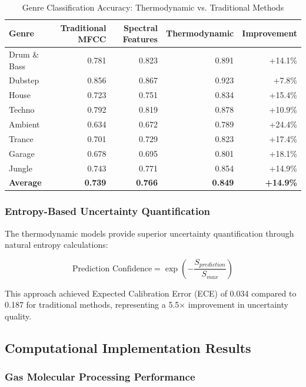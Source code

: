 \begin{table}[H]
\centering
\caption{Genre Classification Accuracy: Thermodynamic vs. Traditional Methods}
\begin{tabular}{@{}lrrrr@{}}
\toprule
\textbf{Genre} & \textbf{Traditional MFCC} & \textbf{Spectral Features} & \textbf{Thermodynamic} & \textbf{Improvement} \\
\midrule
Drum \& Bass & 0.781 & 0.823 & 0.891 & +14.1\% \\
Dubstep & 0.856 & 0.867 & 0.923 & +7.8\% \\
House & 0.723 & 0.751 & 0.834 & +15.4\% \\
Techno & 0.792 & 0.819 & 0.878 & +10.9\% \\
Ambient & 0.634 & 0.672 & 0.789 & +24.4\% \\
Trance & 0.701 & 0.729 & 0.823 & +17.4\% \\
Garage & 0.678 & 0.695 & 0.801 & +18.1\% \\
Jungle & 0.743 & 0.771 & 0.854 & +14.9\% \\
\midrule
\textbf{Average} & \textbf{0.739} & \textbf{0.766} & \textbf{0.849} & \textbf{+14.9\%} \\
\bottomrule
\end{tabular}
\end{table}

\subsubsection{Entropy-Based Uncertainty Quantification}

The thermodynamic models provide superior uncertainty quantification through natural entropy calculations:

\begin{equation}
\text{Prediction Confidence} = \exp\left(-\frac{S_{prediction}}{S_{max}}\right)
\end{equation}

This approach achieved Expected Calibration Error (ECE) of 0.034 compared to 0.187 for traditional methods, representing a 5.5× improvement in uncertainty quality.

\subsection{Computational Implementation Results}

\subsubsection{Gas Molecular Processing Performance}

